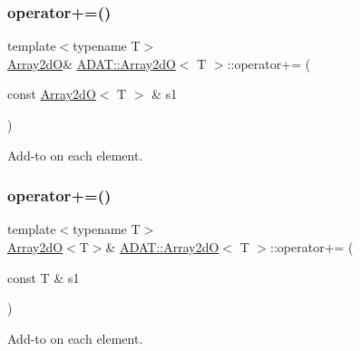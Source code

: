 \subsubsection{\texorpdfstring{operator+=()}{operator+=()}\hspace{0.1cm}{\footnotesize\ttfamily [2/4]}}
{\footnotesize\ttfamily template$<$typename T$>$ \\
\mbox{\hyperlink{classADAT_1_1Array2dO}{Array2dO}}\& \mbox{\hyperlink{classADAT_1_1Array2dO}{A\+D\+A\+T\+::\+Array2dO}}$<$ T $>$\+::operator+= (\begin{DoxyParamCaption}\item[{const \mbox{\hyperlink{classADAT_1_1Array2dO}{Array2dO}}$<$ T $>$ \&}]{s1 }\end{DoxyParamCaption})\hspace{0.3cm}{\ttfamily [inline]}}



Add-\/to on each element. 

\mbox{\label{classADAT_1_1Array2dO_ae36484e0516c671683a97079f32bd6d8}} 
\subsubsection{\texorpdfstring{operator+=()}{operator+=()}\hspace{0.1cm}{\footnotesize\ttfamily [3/4]}}
{\footnotesize\ttfamily template$<$typename T$>$ \\
\mbox{\hyperlink{classADAT_1_1Array2dO}{Array2dO}}$<$T$>$\& \mbox{\hyperlink{classADAT_1_1Array2dO}{A\+D\+A\+T\+::\+Array2dO}}$<$ T $>$\+::operator+= (\begin{DoxyParamCaption}\item[{const T \&}]{s1 }\end{DoxyParamCaption})\hspace{0.3cm}{\ttfamily [inline]}}



Add-\/to on each element. 

\mbox{\label{classADAT_1_1Array2dO_ae36484e0516c671683a97079f32bd6d8}} 
